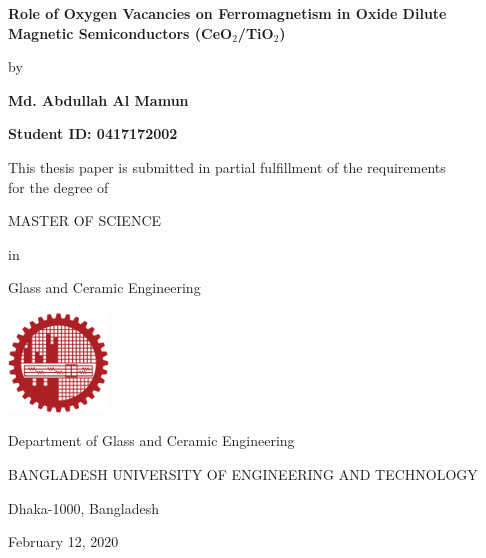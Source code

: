 \documentclass[main.tex]{subfiles}
\begin{document}
\thispagestyle{empty}


   \begin{center}
       \vspace*{0.6cm}
 
       \textbf{ \Large \color{black} {Role of Oxygen Vacancies on Ferromagnetism in Oxide Dilute Magnetic Semiconductors (CeO$_{2}$/TiO$_{2}$)}}
 
       \vspace*{0.5cm}
        by
 
       \vspace{0.5cm}
 
       \textbf{\color{black} {Md. Abdullah Al Mamun}}

	\vspace*{0.5cm}
	
 	\textbf{Student ID: 0417172002}

	\vspace*{3.0cm}
	
 
       This thesis paper is submitted in partial fulfillment of the requirements\\ for the degree of

	\vspace*{0.8cm}

      \uppercase{Master of Science}\\
	
	\vspace*{0.5cm}
	
	in
 
       \vspace*{0.5cm}

	Glass and Ceramic Engineering
 	
	\vspace*{2.0cm}

       \includegraphics[width=0.2\textwidth]{buet_logo}
 	
	\vspace*{1.5cm}

       Department of Glass and Ceramic Engineering\\
	
	\vspace*{0.5cm}

       \uppercase{Bangladesh University of Engineering and Technology}\\

	\vspace*{0.5cm}

       Dhaka-1000, Bangladesh\\
       
	\vspace*{0.5cm}

	February 12, 2020
 
   \end{center}

\thispagestyle{empty}
\newpage
\end{document}
